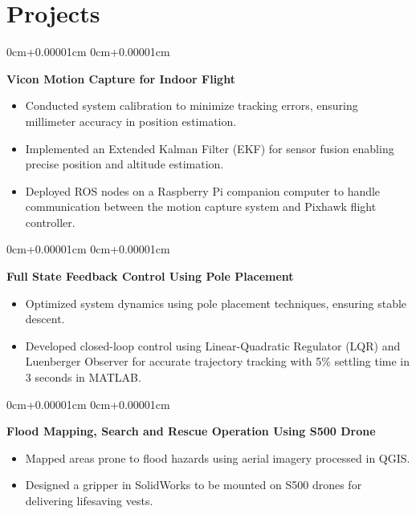 \documentclass[10pt, letterpaper]{article}
\newenvironment{highlights}{
    \begin{itemize}[
        topsep=0.05cm,
        parsep=0.05cm,
        partopsep=0pt,
        itemsep=0pt,
        leftmargin=0cm+10pt
    ]
}{
    \end{itemize}
}
\newenvironment{onecolentry}{
    \begin{adjustwidth}{
        0cm+0.00001cm
    }{
        0cm+0.00001cm
    }
}{
    \end{adjustwidth}
}
\begin{document}
\section{Projects}

\begin{onecolentry}
    \textbf{Vicon Motion Capture for Indoor Flight} \\
    \begin{highlights}
        \item Conducted system calibration to minimize tracking errors, ensuring millimeter accuracy in position estimation.
        \item Implemented an Extended Kalman Filter (EKF) for sensor fusion enabling precise position and altitude estimation.
        \item Deployed ROS nodes on a Raspberry Pi companion computer to handle communication between the motion capture system and Pixhawk flight controller.
    \end{highlights}
\end{onecolentry}

\vspace{0.1cm}

\begin{onecolentry}
    \textbf{Full State Feedback Control Using Pole Placement} \\
    \begin{highlights}
        \item Optimized system dynamics using pole placement techniques, ensuring stable descent.
        \item Developed closed-loop control using Linear-Quadratic Regulator (LQR) and Luenberger Observer for accurate trajectory tracking with 5\% settling time in 3 seconds in MATLAB.
    \end{highlights}
\end{onecolentry}

\vspace{0.1cm}

\begin{onecolentry}
    \textbf{Flood Mapping, Search and Rescue Operation Using S500 Drone} \\
    \begin{highlights}
        \item Mapped areas prone to flood hazards using aerial imagery processed in QGIS.
        \item Designed a gripper in SolidWorks to be mounted on S500 drones for delivering lifesaving vests.
    \end{highlights}
\end{onecolentry}
\end{document}
